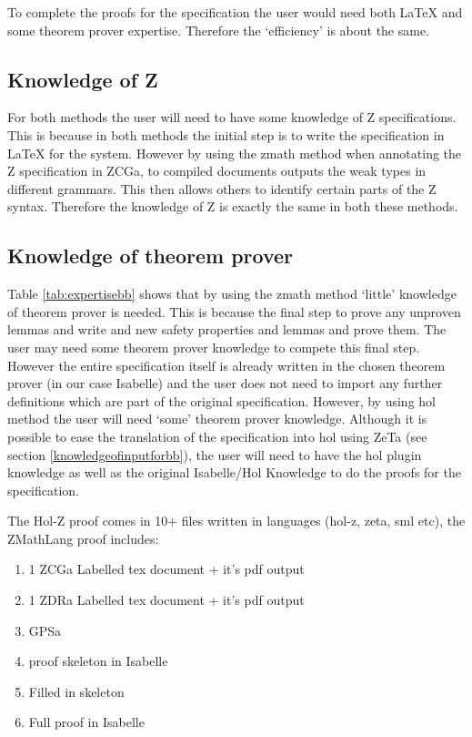 To complete the proofs for the specification the user would need both \LaTeX{} and some theorem
prover expertise. Therefore the `efficiency' is about the same.

\subsection{Knowledge of Z}

For both methods the user will need to have some knowledge of Z specifications.
This is because in both methods the initial step is to write the specification
in \LaTeX{} for the system. However by using the \gls{zmath} method when
annotating the Z specification in ZCGa, to compiled documents outputs the weak
types in different grammars. This then allows others to identify certain parts
of the Z syntax. Therefore the knowledge of Z is exactly the same in both these
methods.

\subsection{Knowledge of theorem prover}

Table \ref{tab:expertisebb} shows that by using the \gls{zmath} method `little'
knowledge of theorem prover is needed. This is because the final step to prove
any unproven lemmas and write and new safety properties and lemmas and prove
them. The user may need some theorem prover knowledge to compete this
final step. However the entire specification itself is already written in the
chosen theorem prover (in our case Isabelle) and the user does not need to
import any further definitions which are part of the original specification.
However, by using \gls{hol} method the user will need `some' theorem prover
knowledge. Although it is possible to ease the translation of the specification
into \gls{hol} using ZeTa (see section \ref{knowledgeofinputforbb}), the user
will need to have the \gls{hol} plugin knowledge as well as the original
Isabelle/Hol Knowledge to do the proofs for the specification.

The Hol-Z proof comes in 10+ files written in languages (hol-z, zeta, sml etc), the ZMathLang proof
includes:
\begin{enumerate}
    \item 1 ZCGa Labelled tex document + it's pdf output
    \item 1 ZDRa Labelled tex document + it's pdf output
    \item GPSa
    \item proof skeleton in Isabelle
    \item Filled in skeleton
    \item Full proof in Isabelle
\end{enumerate}

